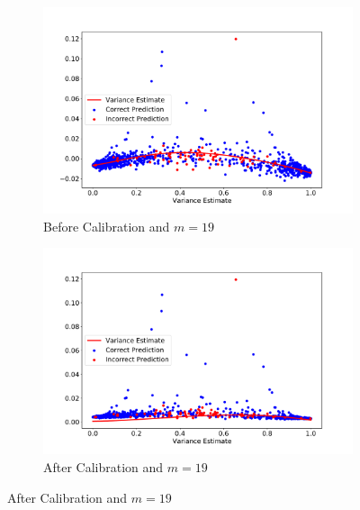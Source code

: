 \documentclass[11pt]{article}
\begin{document}
\begin{figure}[htbp]
	\bigskip
	\begin{subfigure}[b]{0.48\textwidth}
		\centering
		\includegraphics[width=\textwidth]{../figures/BC_Real1.pdf}
		\caption{Before Calibration and $m=19$}
		\label{fig:Before_Calibration_Real_19}
	\end{subfigure}
	\hfill
	\begin{subfigure}[b]{0.48\textwidth}
		\centering
		\includegraphics[width=\textwidth]{../figures/AC_Real1.pdf}
		\caption{After Calibration and $m=19$}
		\label{fig:Calibration_Real_19}
	\end{subfigure}


\end{figure}
\end{document}
